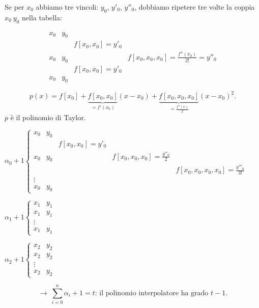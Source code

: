 \begin{exe}
Se per $x_0$ abbiamo tre vincoli: $y_0, \, y'_0, \, y''_0$, dobbiamo ripetere
tre volte la coppia $x_0 \ y_0$ nella tabella:

\[\begin{array}{llllll}
x_0 & y_0   &   \\
    &     & f[x_0,x_0]= y'_0 \\
x_0 & y_0  &            & f[x_0,x_0,x_0]  = \frac{f''(x_0)}{2!} = y''_0\\
    &     & f[x_0,x_0]= y'_0 &           \\
x_0 & y_0 &
\end{array}\]

\[p(x) = f[x_0] + \underbrace{f[x_0,x_0]}_{= f'(x_0)}(x-x_0) +
\underbrace{f[x_0,x_0,x_0]}_{= \frac{f''(x)}{2}}(x-x_0)^2.\]
$p$ è il polinomio di Taylor.
\end{exe}

\begin{flushleft}
$\alpha_0 + 1 \left\{
\begin{array}{lllll}
x_0 & y_0  \\
    &     & f[x_0,x_0] = y'_0 \\
x_0 & y_0 &  & f[x_0,x_0,x_0] = \frac{y''_0}{2} \\
    &     &  &         & f[x_0,x_0,x_0,x_0] = \frac{y'''_0}{3!}\\
\vdots \\
x_0 & y_0
\end{array}
\right.$
\end{flushleft}
\begin{flushleft}
$\alpha_1 + 1 \left\{
\begin{array}{ll}
x_1 & y_1  \\
x_1 & y_1 \\

\vdots \\
x_1 & y_1
\end{array}
\right.$
\end{flushleft}
\begin{flushleft}
$\alpha_2 + 1 \left\{
\begin{array}{ll}
x_2 & y_2  \\
x_2 & y_2 \\

\vdots \\
x_2 & y_2
\end{array}
\right.$
\end{flushleft}

\[\longrightarrow \ \sum_{i=0}^n\alpha_i + 1 = t \textrm{: il polinomio
interpolatore ha grado } t-1.\]

